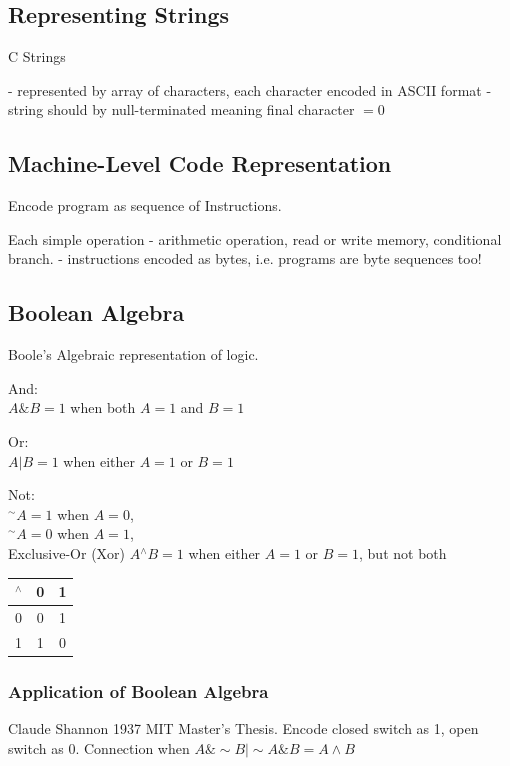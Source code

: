 \documentclass[10pt]{amsart}
\begin{document}
\begin{multicols*}{2}
\subsection{Representing Strings}

C Strings

- represented by array of characters, each character encoded in ASCII format 
- string should by null-terminated meaning final character $=0$

\subsection{Machine-Level Code Representation}

Encode program as sequence of Instructions. 

Each simple operation
- arithmetic operation, read or write memory, conditional branch.
- instructions encoded as bytes, 
i.e. programs are byte sequences too!

\subsection{Boolean Algebra}

Boole's Algebraic representation of logic.

And: \\
$A \& B = 1$ when both $A=1$ and $B=1$

Or: \\
$A | B = 1$ when either $A=1$ or $B=1$

Not: \\
${}^{\sim}A= 1$ when $A=0$, \\
${}^{\sim}A= 0$ when $A=1$, \\

Exclusive-Or (Xor)
$A {}^{\wedge} B = 1$ when either $A=1$ or $B=1$, but not both

\begin{center}
	\begin{tabular}{ l | c  c }
		${}^{\wedge}$ & 0 & 1 \\ \hline 
		0 & 0 & 1 \\
		1 & 1 & 0
	\end{tabular}
\end{center}

\subsubsection{Application of Boolean Algebra}

Claude Shannon 1937 MIT Master's Thesis. Encode closed switch as 1, open switch as 0. Connection when $A\& \sim B | \sim A \& B = A \wedge B$


\end{multicols*}
\end{document}
